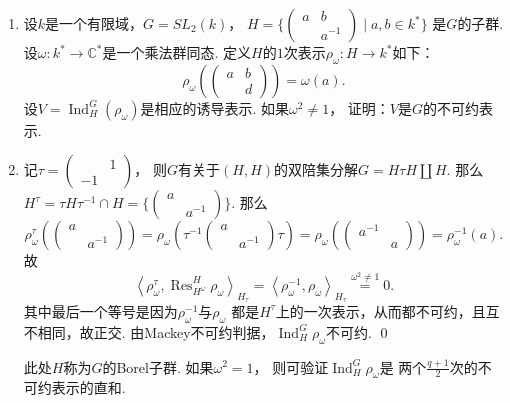 \begin{enumerate}
    \item[13.5] 设$k$是一个有限域，$G = SL_{2}(k)$，
    $H= \{\begin{pmatrix} a & b \\ & a^{-1} \end{pmatrix} \mid a,b \in k^{*}\}$
    是$G$的子群. 
    设$\omega: k^{*} \rightarrow \mathbb{C}^{*}$是一个乘法群同态.
    定义$H$的$1$次表示$\rho_{\omega}:H \rightarrow k^{*}$如下：
    \[\rho_{\omega}(\begin{pmatrix} a & b \\ & d\end{pmatrix}) = \omega(a).\]
    设$V = \operatorname{Ind}_{H}^{G}(\rho_{\omega})$是相应的诱导表示.
    如果$\omega^{2} \neq 1$，
    证明：$V$是$G$的不可约表示.
    \item[\textbf{证明:}]
    记$\tau = \begin{pmatrix} & 1 \\ -1 & \end{pmatrix}$，
    则$G$有关于$(H,H)$的双陪集分解$G = H \tau H \coprod H$.
    那么$H^{\tau} = \tau H \tau^{-1} \cap H 
    = \{\begin{pmatrix} a & \\ & a^{-1} \end{pmatrix}\}$.
    那么
    \[\rho_{\omega}^{\tau}(\begin{pmatrix} a & \\ & a^{-1} \end{pmatrix}) 
    = \rho_{\omega}(\tau^{-1}\begin{pmatrix} a & \\ & a^{-1} \end{pmatrix}\tau)
    = \rho_{\omega}(\begin{pmatrix} a^{-1} & \\ & a \end{pmatrix}) 
    = \rho_{\omega}^{-1}(a).\]
    故
    \[\left<\rho_{\omega}^{\tau},
    \operatorname{Res}_{H^{\omega}}^{H}\rho_{\omega}\right>_{H_{\tau}}
    = \left<\rho_{\omega}^{-1},
    \rho_{\omega}\right>_{H_{\tau}}
    \overset{\omega^{2} \neq 1}= 0.\]
    其中最后一个等号是因为$\rho_{\omega}^{-1}$与$\rho_{\omega}$
    都是$H^{\tau}$上的一次表示，从而都不可约，且互不相同，故正交.
    由Mackey不可约判据，$\operatorname{Ind}_{H}^{G}\rho_{\omega}$不可约. \qed

    \begin{remark}
        此处$H$称为$G$的Borel子群. 如果$\omega^{2} = 1$，
        则可验证$\operatorname{Ind}_{H}^{G}\rho_{\omega}$是
        两个$\frac{q+1}{2}$次的不可约表示的直和.
    \end{remark}

    \end{enumerate}